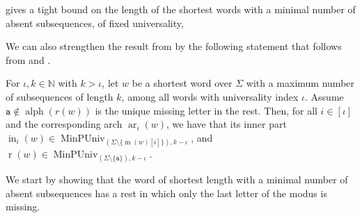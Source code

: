 \documentclass[runningheads,UKenglish,cleveref, autoref, thm-restate]{llncs}
\newcommand{\N}{\mathbb{N}}
\def\ta{\mathtt{a}}
\def\r{\operatorname{r}}
\def\m{\operatorname{m}}
\DeclareMathOperator{\ar}{ar}
\DeclareMathOperator{\al}{alph}
\DeclareMathOperator\ScatFact{SubSeq}
\DeclareMathOperator{\MinPerfUniv}{MinPUniv}
\DeclareMathOperator{\inner}{in}
\newif\ifpaper
\begin{document}
 gives a tight bound on the length of the shortest words with a minimal number of absent subsequences, of fixed universality,
\ifpaper
allowing us to also identify the precise structure of such words, in \cref{corollary:min-absent-arch-rest-puniv-iota}. Ultimately, this leads to the main result of this section, namely \cref{prop:equiv}. 
\else
We can also strengthen the result from  by the following statement that follows from 
and .
\fi

\begin{proposition}\label{corollary:min-absent-arch-rest-puniv-iota}
    For $\iota, k\in\N$ with $k > \iota$, let $w$ be a shortest word over $\Sigma$ with a maximum number of subsequences of length $k$, among all words with universality index $\iota$. Assume $\ta\notin\al(r(w))$ is the unique missing letter in the rest.
    Then, for all $i\in[\iota]$ and the corresponding arch $\ar_i(w)$, we have that its inner part $\inner_i(w) \in \MinPerfUniv_{(\Sigma\setminus\{\m(w)[i]\}),k-\iota}$,
    and $\r(w) \in \MinPerfUniv_{(\Sigma\setminus\{\ta\}),k-\iota}$.
\end{proposition}


\ifpaper
\else
We start by showing that the word of shortest length with a minimal number of absent subsequences has a rest in which only the last letter of the modus is missing.
\fi 
\end{document}
